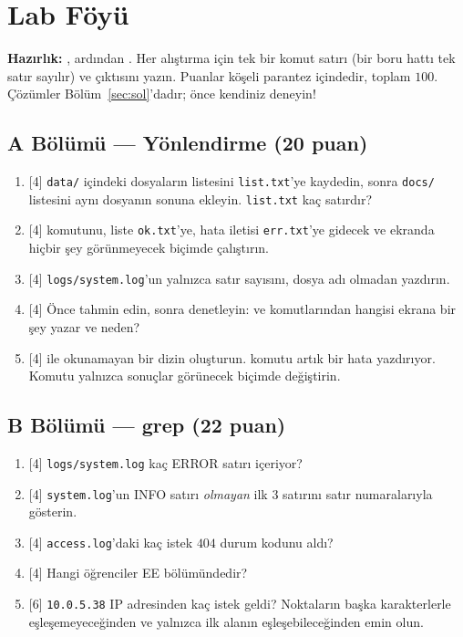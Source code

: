\section{Lab Föyü}
\label{sec:lab}

\textbf{Hazırlık:} , ardından . Her alıştırma için tek bir komut satırı (bir boru hattı tek satır sayılır) ve çıktısını yazın. Puanlar köşeli parantez içindedir, toplam $100$. Çözümler Bölüm~\ref{sec:sol}'dadır; önce kendiniz deneyin!

\subsection*{A Bölümü --- Yönlendirme (20 puan)}
\begin{enumerate}[leftmargin=2.2em,label=\textbf{A\arabic*}]
  \item {[4]} \texttt{data/} içindeki dosyaların listesini \texttt{list.txt}'ye kaydedin, sonra \texttt{docs/} listesini aynı dosyanın sonuna ekleyin. \texttt{list.txt} kaç satırdır?
  \item {[4]}  komutunu, liste \texttt{ok.txt}'ye, hata iletisi \texttt{err.txt}'ye gidecek ve ekranda hiçbir şey görünmeyecek biçimde çalıştırın.
  \item {[4]} \texttt{logs/system.log}'un yalnızca satır sayısını, dosya adı olmadan yazdırın.
  \item {[4]} Önce tahmin edin, sonra denetleyin:  ve  komutlarından hangisi ekrana bir şey yazar ve neden?
  \item {[4]}  ile okunamayan bir dizin oluşturun.  komutu artık bir hata yazdırıyor. Komutu yalnızca sonuçlar görünecek biçimde değiştirin.
\end{enumerate}

\subsection*{B Bölümü --- grep (22 puan)}
\begin{enumerate}[leftmargin=2.2em,label=\textbf{B\arabic*}]
  \item {[4]} \texttt{logs/system.log} kaç ERROR satırı içeriyor?
  \item {[4]} \texttt{system.log}'un INFO satırı \emph{olmayan} ilk $3$ satırını satır numaralarıyla gösterin.
  \item {[4]} \texttt{access.log}'daki kaç istek $404$ durum kodunu aldı?
  \item {[4]} Hangi öğrenciler EE bölümündedir?
  \item {[6]} \texttt{10.0.5.38} IP adresinden kaç istek geldi? Noktaların başka karakterlerle eşleşemeyeceğinden ve yalnızca ilk alanın eşleşebileceğinden emin olun.
\end{enumerate}

